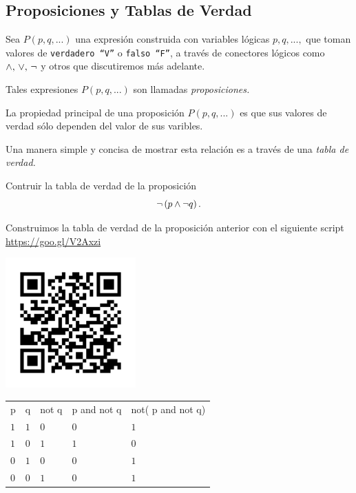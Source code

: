 \subsection{Proposiciones y Tablas de Verdad}


 Sea $P(p,q,...)$ una expresi\'on construida con variables l\'ogicas $p,q,...,$ que toman valores de \texttt{verdadero ``V''} o \texttt{falso ``F''}, a trav\'es de conectores l\'ogicos como $\wedge, \, \vee, \, \neg$ y otros  que discutiremos m\'as adelante.
 
 
 Tales expresiones $P(p,q,...)$ son llamadas \emph{proposiciones.}



 La propiedad principal de una proposici\'on $P(p,q,...)$ es que sus valores de verdad s\'olo dependen del valor de sus varibles. 
 
 
 Una manera simple y concisa de mostrar esta relaci\'on es a trav\'es de una \emph{tabla de verdad.}



 \begin{exmp}
  Contruir la tabla de verdad de la proposici\'on
  $$\neg \left( p \wedge \neg q \right).$$
 \end{exmp}




 Construimos la tabla de verdad de la proposici\'on anterior con el siguiente script \href{https://goo.gl/V2Axzi}{https://goo.gl/V2Axzi}
\begin{center}
        \includegraphics[height=5cm,keepaspectratio=true]{./md/MD01_TDV04.png}
\end{center}
 



 \begin{tdv} 
  \begin{tabular}{lllll}
p & q & not q & p and not q & not( p and not q) \\
$1$ & $1$ & $0$ & $0$ & $1$ \\
$1$ & $0$ & $1$ & $1$ & $0$ \\
$0$ & $1$ & $0$ & $0$ & $1$ \\
$0$ & $0$ & $1$ & $0$ & $1$ \\
\end{tabular}
 \end{tdv}




